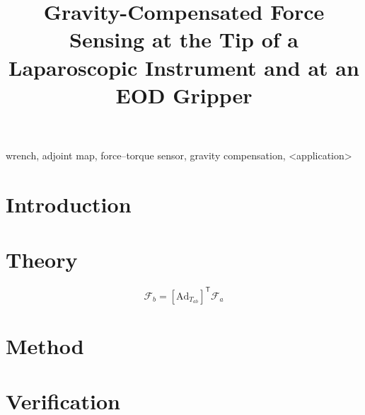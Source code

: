 \documentclass[conference]{IEEEtran}
\newcommand{\Ad}[1]{[\mathrm{Ad}_{#1}]}
\begin{document}
\title{Gravity-Compensated Force Sensing at the Tip of a Laparoscopic Instrument and at an EOD Gripper}

\author{
}

\maketitle

\begin{abstract}
\end{abstract}

\begin{IEEEkeywords}
wrench, adjoint map, force--torque sensor, gravity compensation, <application>
\end{IEEEkeywords}

\section{Introduction}

\section{Theory}
\begin{equation}
\mathcal F_b = \Ad{T_{ab}}^{\mathsf T}\mathcal F_a
\end{equation}

\section{Method}

\section{Verification}
\end{document}
